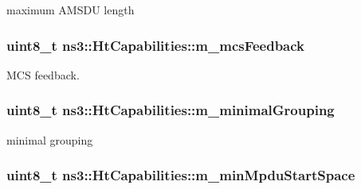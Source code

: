 maximum A\+M\+S\+DU length 

\subsubsection[{\texorpdfstring{m\+\_\+mcs\+Feedback}{m_mcsFeedback}}]{\setlength{\rightskip}{0pt plus 5cm}uint8\+\_\+t ns3\+::\+Ht\+Capabilities\+::m\+\_\+mcs\+Feedback\hspace{0.3cm}{\ttfamily [private]}}\hypertarget{classns3_1_1HtCapabilities_ab38ccae8373c2f12916d3c1d499ac1ce}{}\label{classns3_1_1HtCapabilities_ab38ccae8373c2f12916d3c1d499ac1ce}


M\+CS feedback. 

\subsubsection[{\texorpdfstring{m\+\_\+minimal\+Grouping}{m_minimalGrouping}}]{\setlength{\rightskip}{0pt plus 5cm}uint8\+\_\+t ns3\+::\+Ht\+Capabilities\+::m\+\_\+minimal\+Grouping\hspace{0.3cm}{\ttfamily [private]}}\hypertarget{classns3_1_1HtCapabilities_a5084a740132ff1756aefc28e022e4481}{}\label{classns3_1_1HtCapabilities_a5084a740132ff1756aefc28e022e4481}


minimal grouping 

\subsubsection[{\texorpdfstring{m\+\_\+min\+Mpdu\+Start\+Space}{m_minMpduStartSpace}}]{\setlength{\rightskip}{0pt plus 5cm}uint8\+\_\+t ns3\+::\+Ht\+Capabilities\+::m\+\_\+min\+Mpdu\+Start\+Space\hspace{0.3cm}{\ttfamily [private]}}\hypertarget{classns3_1_1HtCapabilities_a50cafdfb23fe314fda250335d49f8a73}{}\label{classns3_1_1HtCapabilities_a50cafdfb23fe314fda250335d49f8a73}


